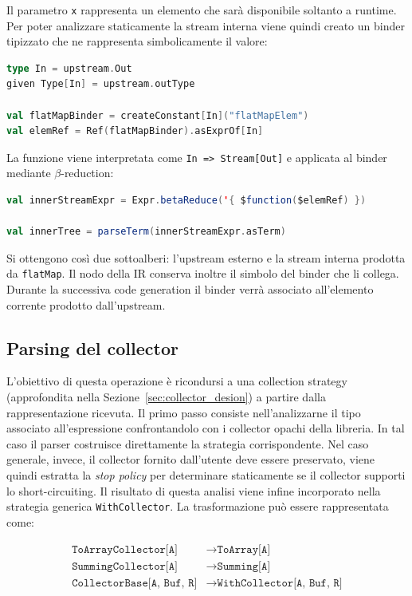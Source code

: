 \documentclass[a4paper,11pt]{report}
\theoremstyle{definition}
\begin{document}
Il parametro \texttt{x} rappresenta un elemento che sarà disponibile soltanto a runtime. Per poter analizzare staticamente la stream interna viene quindi creato un binder tipizzato che ne rappresenta simbolicamente il valore:

\begin{lstlisting}[language=Scala]
type In = upstream.Out
given Type[In] = upstream.outType

val flatMapBinder = createConstant[In]("flatMapElem")
val elemRef = Ref(flatMapBinder).asExprOf[In]
\end{lstlisting}

La funzione viene interpretata come \texttt{In => Stream[Out]} e applicata al binder mediante $\beta$-reduction:

\begin{lstlisting}[language=Scala]
val innerStreamExpr = Expr.betaReduce('{ $function($elemRef) })

val innerTree = parseTerm(innerStreamExpr.asTerm)
\end{lstlisting}

Si ottengono così due sottoalberi: l'upstream esterno e la stream interna prodotta da \texttt{flatMap}. Il nodo della IR conserva inoltre il simbolo del binder che li collega. Durante la successiva code generation il binder verrà associato all'elemento corrente prodotto dall'upstream.

\subsection{Parsing del collector}
\label{subsec:parsing_collector}
L'obiettivo di questa operazione è ricondursi a una collection strategy (approfondita nella Sezione~\ref{sec:collector_desion}) a partire dalla rappresentazione ricevuta. Il primo passo consiste nell'analizzarne il tipo associato all'espressione confrontandolo con i collector opachi della libreria. In tal caso il parser costruisce direttamente la strategia corrispondente. Nel caso generale, invece, il collector fornito dall'utente deve essere preservato, viene quindi estratta la \emph{stop policy} per determinare staticamente se il collector supporti lo short-circuiting. Il risultato di questa analisi viene infine incorporato nella strategia generica \texttt{WithCollector}. La trasformazione può essere rappresentata come:

$$
\begin{aligned}
  \texttt{ToArrayCollector[A]}
  & \longrightarrow \texttt{ToArray[A]} \\[2mm]
  \texttt{SummingCollector[A]}
  & \longrightarrow \texttt{Summing[A]} \\[2mm]
  \texttt{CollectorBase[A, Buf, R]}
  & \longrightarrow
  \texttt{WithCollector[A, Buf, R]}
\end{aligned}
$$
\end{document}

